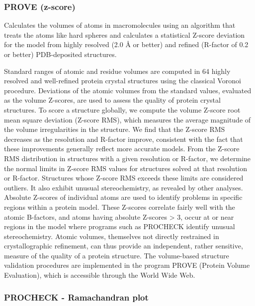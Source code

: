 \documentclass[11pt, letterpaper, portuguese]{article}
\begin{document}
\subsubsection{PROVE (z-score)}

    \par{Calculates the volumes of atoms in macromolecules using an algorithm that treats the atoms like hard spheres and calculates a statistical Z-score deviation for the model from highly resolved (2.0 Å or better) and refined (R-factor of 0.2 or better) PDB-deposited structures.}

    \par{Standard ranges of atomic and residue volumes are computed in 64 highly resolved and well-refined protein crystal structures using the classical Voronoi procedure. Deviations of the atomic volumes from the standard values, evaluated as the volume Z-scores, are used to assess the quality of protein crystal structures. To score a structure globally, we compute the volume Z-score root mean square deviation (Z-score RMS), which measures the average magnitude of the volume irregularities in the structure. We find that the Z-score RMS decreases as the resolution and R-factor improve, consistent with the fact that these improvements generally reflect more accurate models. From the Z-score RMS distribution in structures with a given resolution or R-factor, we determine the normal limits in Z-score RMS values for structures solved at that resolution or R-factor. Structures whose Z-score RMS exceeds these limits are considered outliers. It also exhibit unusual stereochemistry, as revealed by other analyses. Absolute Z-scores of individual atoms are used to identify problems in specific regions within a protein model. These Z-scores correlate fairly well with the atomic B-factors, and atoms having absolute Z-scores > 3, occur at or near regions in the model where programs such as PROCHECK identify unusual stereochemistry. Atomic volumes, themselves not directly restrained in crystallographic refinement, can thus provide an independent, rather sensitive, measure of the quality of a protein structure. The volume-based structure validation procedures are implemented in the program PROVE (Protein Volume Evaluation), which is accessible through the World Wide Web.}

\subsubsection{PROCHECK -  Ramachandran plot}
\end{document}
